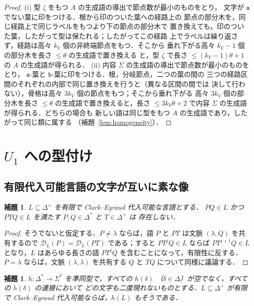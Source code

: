 \documentclass[11pt,a4paper]{ltjsarticle}
\numberwithin{equation}{section}
\theoremstyle{plain}
\newtheorem{lemma}[theorem]{補題}
\theoremstyle{definition}
\theoremstyle{remark}
\theoremstyle{plain}
\newcommand{\D}{\mathcal{D}}
\newcommand{\eps}{\lambda}
\begin{document}
\begin{proof}
(i) 型 $\zeta$ をもつ $A$ の生成語の導出で節点数が最小のものをとり，
文字が $\mathtt a$ でない葉に印をつける．根から印のついた葉への経路上の
節点の部分木を，同じ経路上で同じラベルをもつより下の節点の部分木で
置き換えても，印のついた葉，したがって型は保たれる；したがってこの経路
上でラベルは繰り返さず，経路は高々 $k_V$ 個の非終端節点をもつ．そこから
垂れ下がる高々 $k_V-1$ 個の部分木を長さ $\le\theta$ の生成語で置き換える
と，型 $\zeta$ で長さ $\le(k_V-1)\theta+1$ の $A$ の生成語が得られる．
(ii) 内容 $\Sigma$ の生成語の導出で節点数が最小のものをとり，
$\mathtt a$-葉と $\mathtt b$-葉に印をつける．根，分岐節点，二つの葉の間の
三つの経路区間のそれぞれの内部で同じ置き換えを行うと（異なる区間の間では
決して行わない），骨格は高々 $3k_V$ 個の節点をもつ；そこから垂れ下がる
高々 $3k_V$ 個の部分木を長さ $\le\theta$ の生成語で置き換えると，長さ
$\le3k_V\theta+2$ で内容 $\Sigma$ の生成語が得られる．どちらの場合も
新しい語は同じ型をもつ $A$ の生成語であり，したがって同じ類に属する
（補題~\ref{lem:homogeneity}）．
\end{proof}

\section{\texorpdfstring{$U_1$}{U1} への型付け}
\label{app:u1}

\subsection{有限代入可能言語の文字が互いに素な像}

\begin{lemma}\label{lem:app-u1-insertion}
$L\subseteq\Delta^+$ を有限で Clark--Eyraud 代入可能な言語とする．
$PQ\in L$ かつ $PTQ\in L$ を満たす $P,Q\in\Delta^*$ と $T\in\Delta^+$ は
存在しない．
\end{lemma}

\begin{proof}
そうでないと仮定する．$P\ne\eps$ ならば，語 $P$ と $PT$ は文脈
$(\eps,Q)$ を共有するので $\D_L(P)=\D_L(PT)$ である；すると
$PT^jQ\in L$ ならば $PT^{j+1}Q\in L$ となり，$L$ はあらゆる長さの語
$PT^jQ$ を含むことになって，有限性に反する．$P=\eps$ ならば，文脈 $(\eps,\eps)$ を共有する $Q$ と
$TQ$ について同様に議論する．
\end{proof}

\begin{lemma}\label{lem:app-u1-code}
$h:\Delta^*\to\Sigma^*$ を準同型で，すべての $h(\delta)$
（$\delta\in\Delta$）が空でなく，すべての $h(\delta)$ の連接において
どの文字も二度現れないものとする．$L\subseteq\Delta^+$ が有限で
Clark--Eyraud 代入可能ならば，$h(L)$ もそうである．
\end{lemma}
\end{document}
